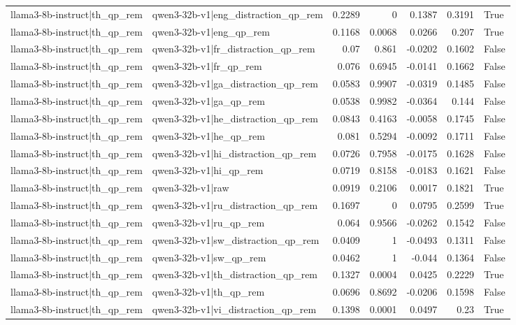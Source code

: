 \begin{table}
\begin{tabular}{l l r r r r l}
llama3-8b-instruct|th_qp_rem & qwen3-32b-v1|eng_distraction_qp_rem & 0.2289 & 0 & 0.1387 & 0.3191 & True \\
llama3-8b-instruct|th_qp_rem & qwen3-32b-v1|eng_qp_rem & 0.1168 & 0.0068 & 0.0266 & 0.207 & True \\
llama3-8b-instruct|th_qp_rem & qwen3-32b-v1|fr_distraction_qp_rem & 0.07 & 0.861 & -0.0202 & 0.1602 & False \\
llama3-8b-instruct|th_qp_rem & qwen3-32b-v1|fr_qp_rem & 0.076 & 0.6945 & -0.0141 & 0.1662 & False \\
llama3-8b-instruct|th_qp_rem & qwen3-32b-v1|ga_distraction_qp_rem & 0.0583 & 0.9907 & -0.0319 & 0.1485 & False \\
llama3-8b-instruct|th_qp_rem & qwen3-32b-v1|ga_qp_rem & 0.0538 & 0.9982 & -0.0364 & 0.144 & False \\
llama3-8b-instruct|th_qp_rem & qwen3-32b-v1|he_distraction_qp_rem & 0.0843 & 0.4163 & -0.0058 & 0.1745 & False \\
llama3-8b-instruct|th_qp_rem & qwen3-32b-v1|he_qp_rem & 0.081 & 0.5294 & -0.0092 & 0.1711 & False \\
llama3-8b-instruct|th_qp_rem & qwen3-32b-v1|hi_distraction_qp_rem & 0.0726 & 0.7958 & -0.0175 & 0.1628 & False \\
llama3-8b-instruct|th_qp_rem & qwen3-32b-v1|hi_qp_rem & 0.0719 & 0.8158 & -0.0183 & 0.1621 & False \\
llama3-8b-instruct|th_qp_rem & qwen3-32b-v1|raw & 0.0919 & 0.2106 & 0.0017 & 0.1821 & True \\
llama3-8b-instruct|th_qp_rem & qwen3-32b-v1|ru_distraction_qp_rem & 0.1697 & 0 & 0.0795 & 0.2599 & True \\
llama3-8b-instruct|th_qp_rem & qwen3-32b-v1|ru_qp_rem & 0.064 & 0.9566 & -0.0262 & 0.1542 & False \\
llama3-8b-instruct|th_qp_rem & qwen3-32b-v1|sw_distraction_qp_rem & 0.0409 & 1 & -0.0493 & 0.1311 & False \\
llama3-8b-instruct|th_qp_rem & qwen3-32b-v1|sw_qp_rem & 0.0462 & 1 & -0.044 & 0.1364 & False \\
llama3-8b-instruct|th_qp_rem & qwen3-32b-v1|th_distraction_qp_rem & 0.1327 & 0.0004 & 0.0425 & 0.2229 & True \\
llama3-8b-instruct|th_qp_rem & qwen3-32b-v1|th_qp_rem & 0.0696 & 0.8692 & -0.0206 & 0.1598 & False \\
llama3-8b-instruct|th_qp_rem & qwen3-32b-v1|vi_distraction_qp_rem & 0.1398 & 0.0001 & 0.0497 & 0.23 & True \\

\end{tabular}
\end{table}
